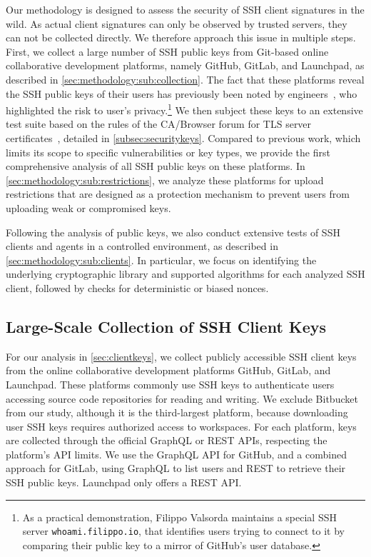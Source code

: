 Our methodology is designed to assess the security of SSH client signatures in the wild. As actual client signatures can only be observed by trusted servers, they can not be collected directly. We therefore approach this issue in multiple steps. First, we collect a large number of SSH public keys from Git-based online collaborative development platforms, namely GitHub, GitLab, and Launchpad, as described in \autoref{sec:methodology:sub:collection}. The fact that these platforms reveal the SSH public keys of their users has previously been noted by engineers~\cite{cox2015,golubin2019,filippo2015}, who highlighted the risk to user's privacy.\footnote{As a practical demonstration, Filippo Valsorda maintains a special SSH server \texttt{whoami.filippo.io}, that identifies users trying to connect to it by comparing their public key to a mirror of GitHub's user database.} We then subject these keys to an extensive test suite based on the rules of the CA/Browser forum for TLS server certificates~\cite{ca-browser-forum-2.1.2}, detailed in \autoref{subsec:securitykeys}. Compared to previous work, which limits its scope to specific vulnerabilities or key types, we provide the first comprehensive analysis of all SSH public keys on these platforms. In \autoref{sec:methodology:sub:restrictions}, we analyze these platforms for upload restrictions that are designed as a protection mechanism to prevent users from uploading weak or compromised keys.

Following the analysis of public keys, we also conduct extensive tests of SSH clients and agents in a controlled environment, as described in \autoref{sec:methodology:sub:clients}. In particular, we focus on identifying the underlying cryptographic library and supported algorithms for each analyzed SSH client, followed by checks for deterministic or biased nonces. 

\subsection{Large-Scale Collection of SSH Client Keys}
\label{sec:methodology:sub:collection}

For our analysis in \autoref{sec:clientkeys}, we collect publicly accessible SSH client keys from the online collaborative development platforms GitHub, GitLab, and Launchpad. These platforms commonly use SSH keys to authenticate users accessing source code repositories for reading and writing. We exclude Bitbucket from our study, although it is the third-largest platform, because downloading user SSH keys requires authorized access to workspaces. For each platform, keys are collected through the official GraphQL or REST APIs, respecting the platform's API limits. We use the GraphQL API for GitHub, and a combined approach for GitLab, using GraphQL to list users and REST to retrieve their SSH public keys. Launchpad only offers a REST API.

